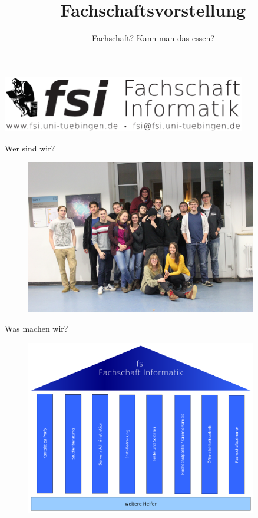 \documentclass{beamer}
\title{Fachschaftsvorstellung}
\subtitle{Fachschaft? Kann man das essen?}
\begin{document}
	\begin{frame}
		\centering
		\includegraphics[width=0.8\textwidth]{pictures/fsilogo_neu.pdf}
		\maketitle
	\end{frame}
	
	\begin{frame}{Wer sind wir?}
		\begin{figure}
			\includegraphics[width=0.9\textwidth]{pictures/fachschaft.jpg}
		\end{figure}
	\end{frame}
	
	\begin{frame}{Was machen wir?}
		\begin{figure}
		\includegraphics[width=0.9\textwidth]{pictures/fsi_saeulen.pdf}
		\end{figure}
	\end{frame}
 	
\end{document}
